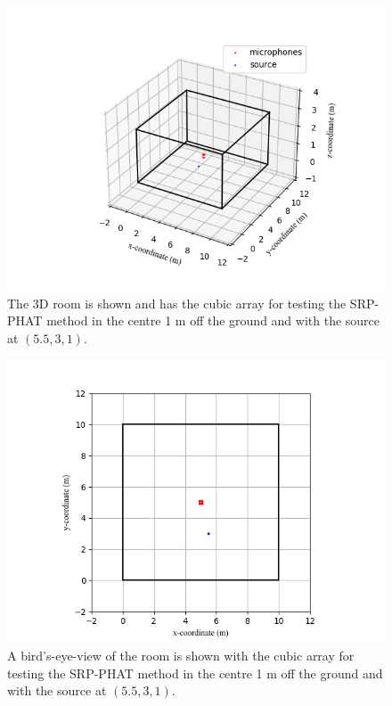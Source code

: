 \documentclass{report}
\begin{document}
\begin{figure}[H]
\includegraphics[width=1\textwidth]{../Python/srp_phat/room_3d.png}
\centering
\caption{The 3D room is shown and has the cubic array for testing the SRP-PHAT method in the centre 1 \si{m} off the ground and with the source at $(5.5,3,1)$.}
\label{fig:srp_phat_room_3d}
\centering
\end{figure}

\begin{figure}[H]
\includegraphics[width=1\textwidth]{../Python/srp_phat/room_2d.png}
\centering
\caption{A bird's-eye-view of the room is shown with the cubic array for testing the SRP-PHAT method in the centre 1 \si{m} off the ground and with the source at $(5.5,3,1)$.}
\label{fig:srp_phat_room_2d}
\centering
\end{figure}
\end{document}
